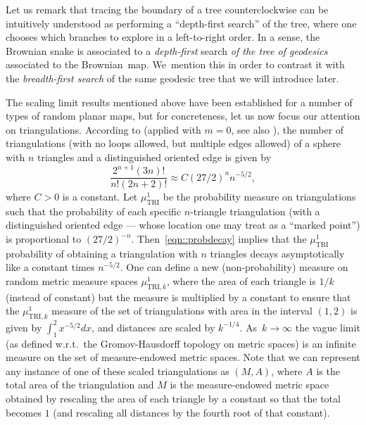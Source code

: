 \documentclass[JEP,XML,SOM,Unicode]{cedram}
\theoremstyle{plain}
\numberwithin{theorem}{section}
\theoremstyle{definition}
\begin{document}
Let us remark that tracing the boundary of a tree counterclockwise can be intuitively understood as performing a ``depth-first search'' of the tree, where one chooses which branches to explore in a left-to-right order. In a sense, the Brownian snake is associated to a \emph{depth-first} search \emph{of the tree of geodesics} associated to the Brownian~map. We~mention this in order to contrast it with the \emph{breadth-first search} of the same geodesic tree that we will introduce later.

The scaling limit results mentioned above have been established for a number of types of random planar maps, but for concreteness, let us now focus our attention on triangulations. According to \cite[Th.\,2.1]{angelschrammUIPT} (applied with $m=0$, see also \cite{angelUIPTpercolation}), the number of triangulations (with no loops allowed, but multiple edges allowed) of a sphere with $n$ triangles and a distinguished oriented edge is given by
\begin{equation}
\label{eqn::probdecay}
\frac{2^{n+1} (3n)!}{n! (2n+2)!} \approx C (27/2)^n n^{-5/2},
\end{equation}
where $C > 0$ is a constant. Let $\mu^1_{\mathrm{TRI}}$ be the probability measure on triangulations such that the probability of each specific $n$-triangle triangulation (with a distinguished oriented edge --- whose location one may treat as a ``marked point'') is proportional to $(27/2)^{-n}$. Then~\eqref{eqn::probdecay} implies that the $\mu^1_{\mathrm{TRI}}$ probability of obtaining a triangulation with $n$ triangles decays asymptotically like a constant times $n^{-5/2}$. One can define a new (non-probability) measure on random metric measure spaces $\mu^1_{\mathrm{TRI},k}$, where the area of each triangle is $1/k$ (instead of constant) but the measure is multiplied by a constant to ensure that the $\mu^1_{\mathrm{TRI},k}$ measure of the set of triangulations with area in the interval $(1,2)$ is given by $\int_1^2 x^{-5/2} dx$, and distances are scaled by $k^{-1/4}$. As~$k \to \infty$ the vague limit (as defined w.r.t.\ the Gromov-Hausdorff topology on metric spaces) is an infinite measure on the set of measure-endowed metric spaces. Note that we can represent any instance of one of these scaled triangulations as $(M, A)$, where $A$ is the total area of the triangulation and $M$ is the measure-endowed metric space obtained by rescaling the area of each triangle by a constant so that the total becomes $1$ (and rescaling all distances by the fourth root of that constant).
\end{document}
